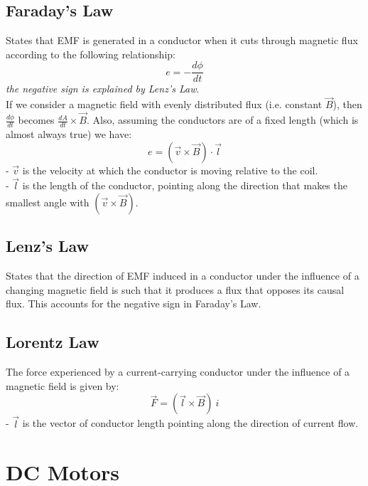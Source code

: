 \documentclass[a4paper]{article}
\begin{document}
\subsection{Faraday's Law}
States that EMF is generated in a conductor when it cuts through magnetic flux according to the following relationship:
$$e= -\frac{d\phi}{dt}$$
\textit{the negative sign is explained by Lenz's Law}. \\
If we consider a magnetic field with evenly distributed flux (i.e. constant $\vec{B}$), 
then $\frac{d\phi}{dt}$ becomes $\frac{dA}{dt} \times \vec{B}$. Also, assuming the conductors are 
of a fixed length (which is almost always true) we have:
$$e= \left( \vec{v} \times \vec{B} \right) \cdot \vec{l} $$
- $\vec{v}$ is the velocity at which the conductor is moving relative to the coil.\\
- $\vec{l}$ is the length of the conductor, pointing along the direction that makes the smallest angle with 
$\left( \vec{v} \times \vec{B} \right)$. \\ 

\subsection{Lenz's Law}
States that the direction of EMF induced in a conductor under the influence of a changing magnetic field is 
such that it produces a flux that opposes its causal flux. This accounts for the negative sign in Faraday's Law.  

\subsection{Lorentz Law}
The force experienced by a current-carrying conductor under the influence of a magnetic field is given by:
$$ \vec{F}= \left( \vec{l} \times \vec{B} \right) \ i $$
- $\vec{l}$ is the vector of conductor length pointing along the direction of current flow.


\section{DC Motors}
\end{document}
